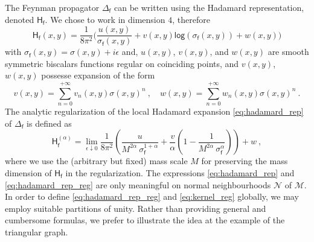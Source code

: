 \documentclass[11pt]{book}
\renewcommand{\log}{\mathsf{log}}
\newcommand{\Mcal}{\mathcal{M}}
\newcommand{\Ncal}{\mathcal{N}}
\newcommand{\Hsf}{\mathsf{H}}
\newcommand{\fsf}{\mathsf{f}}
\theoremstyle{break}
\begin{document}
The Feynman propagator $\Delta_\fsf$ can be written using the Hadamard representation, denoted $\Hsf_\fsf$. We chose to work in dimension $4$, therefore 
%
\begin{equation}
\Hsf_\fsf(x,y) = \frac{1}{8\pi^2} \bigg( \frac{u(x,y)}{\sigma_\fsf(x,y)} + v(x,y) \log\left( \sigma_\fsf(x,y) \right) + w(x,y) \bigg) 
\label{eq:hadamard_rep}
\end{equation}
%
with $\sigma_\fsf(x,y) = \sigma(x,y) + i \epsilon$ and, $u(x,y)$, $v(x,y)$, and $w(x,y)$ are smooth symmetric biscalars functions regular on coinciding points, and $v(x,y)$, $w(x,y)$ possesse expansion of the form
%
\begin{equation*}
v(x,y) = \sum_{n=0}^{+\infty} v_n(x,y) \sigma(x,y)^n \ , \quad 
w(x,y) = \sum_{n=0}^{+\infty} w_n(x,y) \sigma(x,y)^n \ .
\end{equation*}
% 
The analytic regularization of the local Hadamard expansion \ref{eq:hadamard_rep} of $\Delta_\fsf$ is defined as 
%
\begin{equation}
\Hsf^{(\alpha)}_\fsf = \lim_{\epsilon \downarrow 0} \frac{1}{8\pi^2} \left( \frac{u}{M^{2\alpha} \ \sigma_\fsf^{1+\alpha}} + \frac{v}{\alpha} \left( 1 - \frac{1}{ M^{2\alpha} \ \sigma_\fsf^{\alpha} } \right) \right) + w \ ,
\label{eq:hadamard_rep_reg}
\end{equation}
%
where we use the (arbitrary but fixed) mass scale $M$ for preserving the mass dimension of $\Hsf_\fsf$ in the regularization. The expressions \ref{eq:hadamard_rep} and \ref{eq:hadamard_rep_reg} are only meaningful on normal neighbourhoods $\Ncal$ of $\Mcal$. In order to define \ref{eq:hadamard_rep_reg} and \ref{eq:kernel_reg} globally, we may employ suitable partitions of unity. Rather than providing general and cumbersome formulas, we prefer to illustrate the idea at the example of the triangular graph.


\begin{figure}
\begin{center}
\end{center}
\end{figure}
\end{document}

